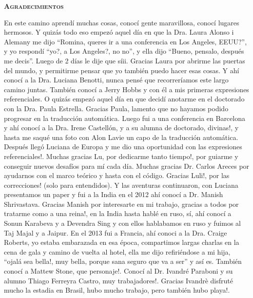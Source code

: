 \thispagestyle{empty}


\begin{center}

{ \vspace*{1cm} }
\huge{\textbf{\textsc{\textmd{Agradecimientos}}}}\\[1cm]

\end{center}

\normalsize{

En este camino aprend\'i muchas cosas, conoc\'i gente maravillosa, conoc\'i lugares hermosos. Y quiz\'as todo eso empez\'o aquel d\'ia en que la Dra. Laura Alonso i Alemany me dijo ``Romina, queres ir a una conferencia en Los Angeles, EEUU?'', y yo respond\'i ``yo?, a Los Angeles?, no no'', y ella dijo ``Bueno, pensalo, despu\'es me decis''. Luego de 2 d\'ias le dije que s\'iii. Gracias Laura por abrirme las puertas del mundo, y permitirme pensar que yo tambi\'en puedo hacer esas cosas. Y ah\'i conoc\'i a la Dra. Luciana Benotti, nunca pens\'e que recorrer\'iamos este largo camino juntas. Tambi\'en conoc\'i a Jerry Hobbs y con \'el a mis primeras expresiones referenciales. O quiz\'as empez\'o aquel d\'ia en que decid\'i anotarme en el doctorado con la Dra. Paula Estrella. Gracias Paula, lamento que no hayamos podido progresar en la traducci\'on autom\'atica. Luego fui a una conferencia en Barcelona y ah\'i conoc\'i a la Dra. Irene Castell\'on, y a su alumna de doctorado, divinas!, y hasta me saqu\'e una foto con Alon Lavie un capo de la traducci\'on autom\'atica. Despu\'es lleg\'o Luciana de Europa y me dio una oportunidad con las expresiones referenciales!. Muchas gracias Lu, por dedicarme tanto tiempo!, por guiarme y conseguir nuevos desaf\'ios para m\'i cada d\'ia. Muchas gracias Dr. Carlos Areces por ayudarnos con el marco te\'orico y hasta con el c\'odigo. Gracias Luli!, por las correcciones! (solo para entendidos). Y las aventuras continuaron, con Luciana presentamos un paper y fui a la India en el 2012 ah\'i conoc\'i a Dr. Manish Shrivastava. Gracias Manish por interesarte en mi trabajo, gracias a todos por tratarme como a una reina!, en la India hasta habl\'e en ruso, s\'i, ah\'i conoc\'i a Sonun Karabeva y a Devendra Sing y con ellos hablabamos en ruso y fuimos al Taj Majal y a Jaipur. En el 2013 fui a Francia, ah\'i conoci a la Dra. Craige Roberts, yo estaba embarazada en esa \'epoca, compartimos largas charlas en la cena de gala y camino de vuelta al hotel, ella me dijo refiri\'endose a mi hija, ``ojal\'a sea bella!, muy bella, porque sana seguro que va a ser'' y as\'i es. Tambi\'en conoc\'i a Mattew Stone, que personaje!. Conoc\'i al Dr. Ivandr\'e Paraboni y su alumno Thiago Ferreyra Castro, muy trabajadores!. Gracias Ivandr\`e disfrut\'e mucho la estadia en Brasil, hubo mucho trabajo, pero tambi\'en hubo playa!. 
}
